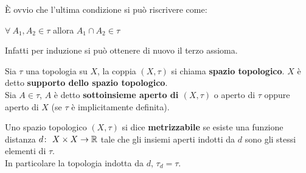\begin{remark}
	È ovvio che l'ultima condizione si può riscrivere come: 
	\begin{center}
		$\forall \ A_1, A_2 \in \tau$ allora $A_1 \cap A_2 \in \tau$ 
	\end{center}
	Infatti per induzione si può ottenere di nuovo il terzo assioma. 
\end{remark}

\begin{definition}
	Sia $\tau$ una topologia su $X$, la coppia $(X, \tau)$ si chiama \textbf{spazio topologico}. $X$ è detto \textbf{supporto dello spazio topologico}. \\ Sia $A \in \tau$, $A$ è detto \textbf{sottoinsieme aperto di $(X,\tau)$} o aperto di $\tau$ oppure aperto di $X$ (se $\tau$ è implicitamente definita). 	
\end{definition}


\begin{definition}
	Uno spazio topologico $(X,\tau)$ si dice \textbf{metrizzabile} se esiste una funzione distanza $d \colon\ X\times X \rightarrow \mathbb{R}$ tale che gli insiemi aperti indotti da $d$ sono gli stessi elementi di $\tau$. \\ In particolare la topologia indotta da $d$, $\tau_d  = \tau$. 
\end{definition}

